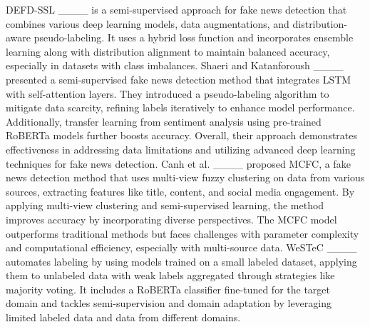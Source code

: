 DEFD-SSL ____ is a semi-supervised approach for fake news detection that combines various deep learning models, data augmentations, and distribution-aware pseudo-labeling. It uses a hybrid loss function and incorporates ensemble learning along with distribution alignment to maintain balanced accuracy, especially in datasets with class imbalances.
Shaeri and Katanforoush ____ presented a semi-supervised fake news detection method that integrates LSTM with self-attention layers. They introduced a pseudo-labeling algorithm to mitigate data scarcity, refining labels iteratively to enhance model performance. Additionally, transfer learning from sentiment analysis using pre-trained RoBERTa models further boosts accuracy. Overall, their approach demonstrates effectiveness in addressing data limitations and utilizing advanced deep learning techniques for fake news detection.
Canh et al. ____ proposed MCFC, a fake news detection method that uses multi-view fuzzy clustering on data from various sources, extracting features like title, content, and social media engagement. By applying multi-view clustering and semi-supervised learning, the method improves accuracy by incorporating diverse perspectives. The MCFC model outperforms traditional methods but faces challenges with parameter complexity and computational efficiency, especially with multi-source data.
WeSTeC ____ automates labeling by using models trained on a small labeled dataset, applying them to unlabeled data with weak labels aggregated through strategies like majority voting. It includes a RoBERTa classifier fine-tuned for the target domain and tackles semi-supervision and domain adaptation by leveraging limited labeled data and data from different domains.

